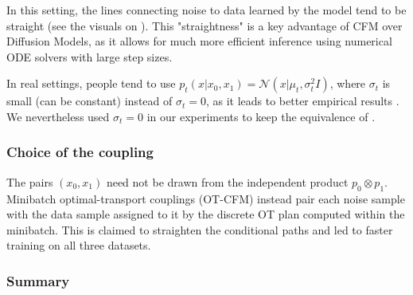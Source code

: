 \documentclass[a4paper,11pt]{article}
\theoremstyle{plain}{\theorembodyfont{\rmfamily}%
\newtheorem{proposition}[theorem]{Proposition}}
\theoremstyle{plain}{\theorembodyfont{\rmfamily}%
\newtheorem{notation}[theorem]{Notation}}
\theoremstyle{plain}{\theorembodyfont{\rmfamily}%
\newtheorem{assumption}[theorem]{Assumption}}
\theoremstyle{plain}{\theorembodyfont{\rmfamily}%
\newtheorem{problem}[theorem]{Problem}}
\theoremstyle{plain}{\theorembodyfont{\rmfamily}%
\newtheorem{example}[theorem]{Example}}
\theoremstyle{plain}{\theorembodyfont{\rmfamily}%
\newtheorem{remark}[theorem]{Remark}}
\theoremstyle{plain}{\theorembodyfont{\rmfamily}%
\newtheorem{definition}[theorem]{Definition}}
\theoremstyle{plain}{\theorembodyfont{\rmfamily}%
\newtheorem{question}[theorem]{Question}}
\numberwithin{equation}{section}
\begin{document}
In this setting, the lines connecting noise to data learned by the model tend to be straight (see the visuals on \cite{gagneux2025avisualdive}). This "straightness" is a key advantage of CFM over Diffusion Models, as it allows for much more efficient inference using numerical ODE solvers with large step sizes.

In real settings, people tend to use $p_t(x|x_0, x_1) = \mathcal{N}(x|\mu_t, \sigma_t^2I)$, where $\sigma_t$ is small (can be constant) instead of $\sigma_t = 0$, as it leads to better empirical results \cite{tong2024improving}. We nevertheless used $\sigma_t = 0$ in our experiments to keep the equivalence of .

\subsubsection{Choice of the coupling}\label{subsec:coupling}

The pairs $(x_0, x_1)$ need not be drawn from the independent product
$p_0 \otimes p_1$. Minibatch optimal-transport couplings (OT-CFM)
\cite{tong2024improving} instead pair each noise sample with the data sample
assigned to it by the discrete OT plan computed within the minibatch. This
is claimed to straighten the conditional paths and led to faster training on all three datasets.

\subsubsection{Summary}
\end{document}
